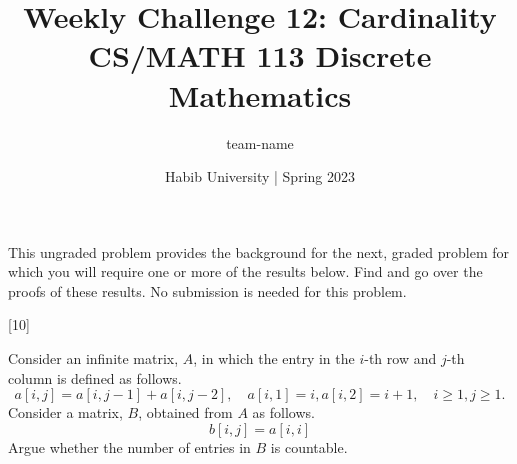 \documentclass[a4paper,addpoints]{exam}
\title{Weekly Challenge 12: Cardinality\\CS/MATH 113 Discrete Mathematics}
\author{team-name}  %
\date{Habib University | Spring 2023}
\begin{document}
\maketitle

\begin{questions}

  This ungraded problem provides the background for the next, graded problem for which you will require one or more of the results below. Find and go over the proofs of these results. No submission is needed for this problem.
  


[10]

  Consider an infinite matrix, $A$, in which the entry in the $i$-th row and $j$-th column is defined as follows.
  \[
    a[i,j] = a[i,j-1] + a[i,j-2], \quad a[i,1] = i, a[i,2] = i+1, \quad i\geq 1, j\geq 1.
  \]
  Consider a matrix, $B$, obtained from $A$ as follows.
  \[
    b[i,j]= a[i,i]
  \]
  Argue whether the number of entries in $B$ is countable.
\end{questions}
\end{document}
